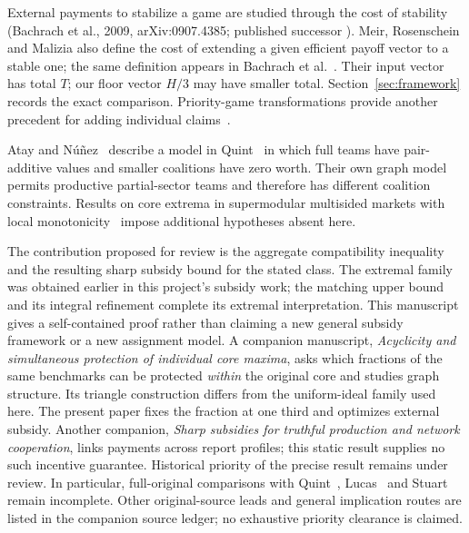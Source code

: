 \documentclass[11pt]{article}
\theoremstyle{remark}
\begin{document}
External payments to stabilize a game are studied through the cost of
stability (Bachrach et al., 2009, arXiv:0907.4385; published successor
\citep{Bachrach2018}). Meir, Rosenschein and Malizia
\citep[Section~2.2]{Meir2011} also define the cost of extending a given
efficient payoff vector to a stable one; the same definition appears in
Bachrach et al.~\citep[Section~5]{Bachrach2018}. Their input vector has total $T$;
our floor vector $H/3$ may have smaller total. Section~\ref{sec:framework}
records the exact comparison. Priority-game transformations provide another
precedent for adding individual claims~\citep{Priority2024}.

Atay and N\'u\~nez~\citep[p.~273]{AtayNunez2019} describe a model in
Quint~\citep{Quint1991} in which full teams have pair-additive values and
smaller coalitions have zero worth. Their own graph model permits productive
partial-sector teams and therefore has different coalition constraints.
Results on core extrema in supermodular multisided markets with local
monotonicity~\citep{Martinez2026} impose additional hypotheses absent here.

The contribution proposed for review is the aggregate compatibility
inequality and the resulting sharp subsidy bound for the stated class.
The extremal family was obtained earlier in this project's subsidy work;
the matching upper bound and its integral refinement complete its extremal
interpretation. This manuscript gives a self-contained proof rather than
claiming a new general subsidy framework or a new assignment model.
A companion manuscript, \emph{Acyclicity and simultaneous protection of
individual core maxima}, asks which fractions of the same benchmarks can
be protected \emph{within} the original core and studies graph structure.
Its triangle construction differs from the uniform-ideal family used here.
The present paper fixes the fraction at one third and optimizes external
subsidy. Another companion, \emph{Sharp subsidies for truthful production
and network cooperation}, links payments across report profiles; this
static result supplies no such incentive guarantee.
Historical priority of the precise result remains under review. In
particular, full-original comparisons with Quint~\citep{Quint1991},
Lucas~\citep{Lucas1995} and Stuart~\citep{Stuart1997} remain incomplete.
Other original-source leads and general implication routes are listed in
the companion source ledger; no exhaustive priority clearance is claimed.
\end{document}
